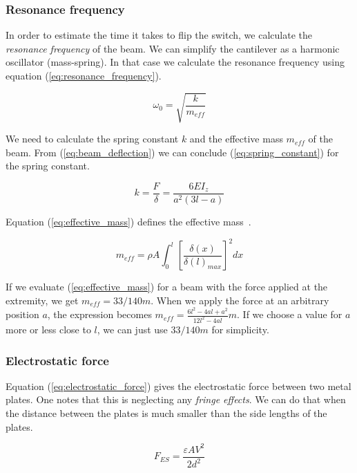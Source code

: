 \subsubsection{Resonance frequency}
In order to estimate the time it takes to flip the switch, we calculate the \emph{resonance frequency} of the beam.
We can simplify the cantilever as a harmonic oscillator (mass-spring).
In that case we calculate the resonance frequency using equation (\ref{eq:resonance_frequency}).

\begin{equation}
	\omega_0 = \sqrt{\frac{k}{m_{eff}}}
	\label{eq:resonance_frequency}
\end{equation}

We need to calculate the spring constant $k$ and the effective mass $m_{eff}$ of the beam.
From (\ref{eq:beam_deflection}) we can conclude (\ref{eq:spring_constant}) for the spring constant.

\begin{equation}
	k = \frac{F}{\delta} = \frac{6EI_z}{a^2(3l-a)}
	\label{eq:spring_constant}
\end{equation}

Equation (\ref{eq:effective_mass}) defines the effective mass~\cite{wong2011theoretical}.

\begin{equation}
	m_{eff} = \rho A \int_0^l{\left[\frac{\delta(x)}{\delta(l)_{max}}\right]^2dx}
	\label{eq:effective_mass}
\end{equation}

If we evaluate (\ref{eq:effective_mass}) for a beam with the force applied at the extremity, we get $m_{eff} = 33/140 m$.
When we apply the force at an arbitrary position $a$, the expression becomes $m_{eff} = \frac{6l^2-4al+a^2}{12l^2-4al} m$.
If we choose a value for $a$ more or less close to $l$, we can just use $33/140m$ for simplicity.


\subsubsection{Electrostatic force}
Equation (\ref{eq:electrostatic_force}) gives the electrostatic force between two metal plates.
One notes that this is neglecting any \emph{fringe effects}.
We can do that when the distance between the plates is much smaller than the side lengths of the plates.

\begin{equation}
	F_{ES} = \frac{\varepsilon AV^2}{2d^2}
	\label{eq:electrostatic_force}
\end{equation}

